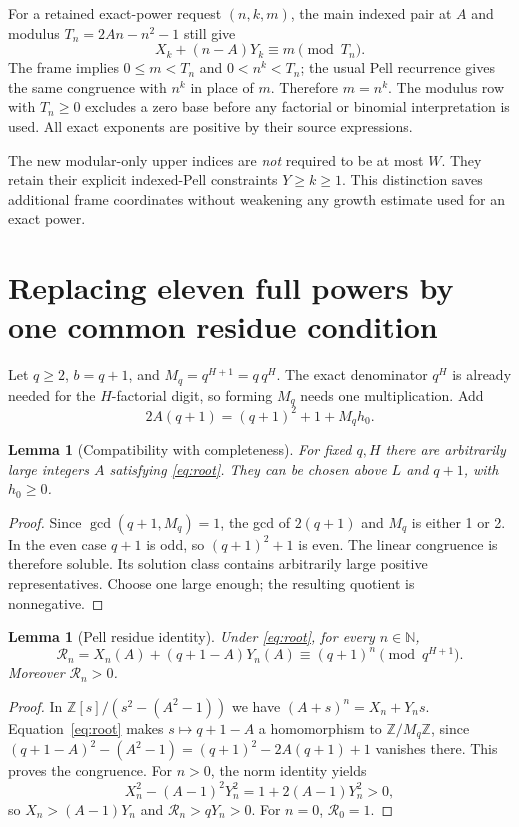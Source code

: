 \documentclass[10pt,letterpaper]{article}
\newtheorem{lemma}[theorem]{Lemma}
\theoremstyle{remark}\newtheorem{remark}[theorem]{Remark}
\newcommand{\N}{\mathbb N}\newcommand{\Z}{\mathbb Z}
\begin{document}
For a retained exact-power request $(n,k,m)$, the main indexed pair at
$A$ and modulus $T_n=2An-n^2-1$ still give
\begin{equation}\label{eq:exactpower}
 X_k+(n-A)Y_k\equiv m\pmod{T_n}.
\end{equation}
The frame implies $0\le m<T_n$ and $0<n^k<T_n$; the usual Pell
recurrence gives the same congruence with $n^k$ in place of $m$.
Therefore $m=n^k$. The modulus row with $T_n\ge0$ excludes a zero
base before any factorial or binomial interpretation is used.
All exact exponents are positive by their source expressions.

The new modular-only upper indices are \emph{not} required to be at
most $W$. They retain their explicit indexed-Pell constraints
$Y\ge k\ge1$. This distinction saves additional frame coordinates
without weakening any growth estimate used for an exact power.

\section{Replacing eleven full powers by one common residue condition}
\label{sec:digits}

Let $q\ge2$, $b=q+1$, and $M_q=q^{H+1}=q\,q^H$.
The exact denominator $q^H$ is already needed for the $H$-factorial
digit, so forming $M_q$ needs one multiplication. Add
\begin{equation}\label{eq:root}
 \boxed{\quad 2A(q+1)=(q+1)^2+1+M_qh_0.\quad}
\end{equation}

\begin{lemma}[Compatibility with completeness]
For fixed $q,H$ there are arbitrarily large integers $A$ satisfying
\eqref{eq:root}. They can be chosen above $L$ and $q+1$, with $h_0\ge0$.
\end{lemma}
\begin{proof}
Since $\gcd(q+1,M_q)=1$, the gcd of $2(q+1)$ and $M_q$ is either 1
or 2. In the even case $q+1$ is odd, so $(q+1)^2+1$ is even.
The linear congruence is therefore soluble. Its solution class contains
arbitrarily large positive representatives. Choose one large enough;
the resulting quotient is nonnegative.
\end{proof}

\begin{lemma}[Pell residue identity]\label{lem:residue}
Under \eqref{eq:root}, for every $n\in\N$,
\begin{equation}\label{eq:residue}
 \boxed{\quad \mathcal R_n=X_n(A)+(q+1-A)Y_n(A)
              \equiv(q+1)^n\pmod{q^{H+1}}.\quad}
\end{equation}
Moreover $\mathcal R_n>0$.
\end{lemma}
\begin{proof}
In $\Z[s]/(s^2-(A^2-1))$ we have
$(A+s)^n=X_n+Y_ns$. Equation~\eqref{eq:root} makes $s\mapsto q+1-A$
a homomorphism to $\Z/M_q\Z$, since
$(q+1-A)^2-(A^2-1)=(q+1)^2-2A(q+1)+1$ vanishes there.
This proves the congruence. For $n>0$, the norm identity yields
\[
 X_n^2-(A-1)^2Y_n^2=1+2(A-1)Y_n^2>0,
\]
so $X_n>(A-1)Y_n$ and $\mathcal R_n>qY_n>0$.
For $n=0$, $\mathcal R_0=1$.
\end{proof}
\end{document}
